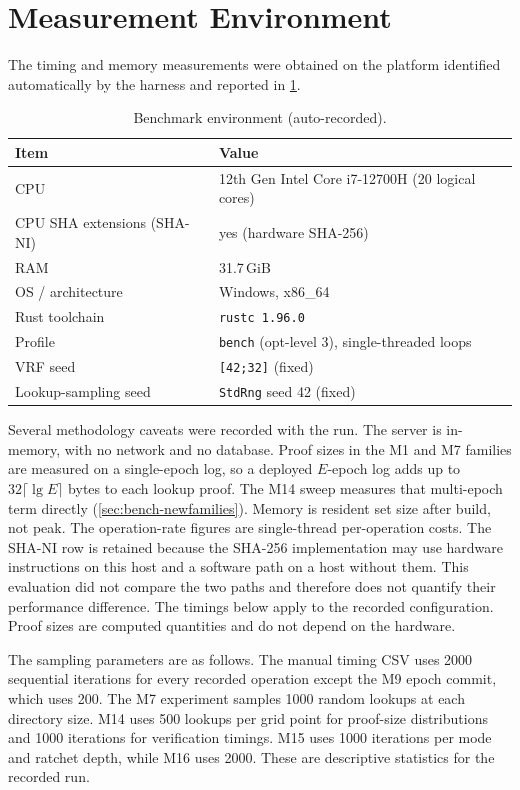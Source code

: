 \section{Measurement Environment}\label{sec:bench-env}

The timing and memory measurements were obtained on the platform identified automatically by the
harness and reported in \cref{tab:bench-env}.

\begin{table}[ht]
\centering
\caption{Benchmark environment (auto-recorded).}
\label{tab:bench-env}
\small
\begin{tabular}{@{}ll@{}}
\toprule
Item & Value \\
\midrule
CPU & 12th Gen Intel Core i7-12700H (20 logical cores) \\
CPU SHA extensions (SHA-NI) & yes (hardware SHA-256) \\
RAM & 31.7\,GiB \\
OS / architecture & Windows, x86\_64 \\
Rust toolchain & \texttt{rustc 1.96.0} \\
Profile & \texttt{bench} (opt-level 3), single-threaded loops \\
VRF seed & \texttt{[42;32]} (fixed) \\
Lookup-sampling seed & \texttt{StdRng} seed 42 (fixed) \\
\bottomrule
\end{tabular}
\end{table}

Several methodology caveats were recorded with the run. The server is in-memory, with no network and
no database. Proof sizes in the M1 and M7 families are measured on a single-epoch log, so a deployed
$E$-epoch log adds up to $32\lceil\lg E\rceil$ bytes to each lookup proof. The M14 sweep measures that
multi-epoch term directly (\cref{sec:bench-newfamilies}). Memory is resident set size after build, not peak.
The operation-rate figures are single-thread per-operation costs. The SHA-NI row is retained
because the SHA-256 implementation may use hardware instructions on this host and a software path
on a host without them. This evaluation did not compare the two paths and therefore does not
quantify their performance difference. The timings below apply to the recorded configuration.
Proof sizes are computed quantities and do not depend on the hardware.

The sampling parameters are as follows. The manual timing CSV uses \num{2000} sequential iterations
for every recorded operation except the M9 epoch commit, which uses \num{200}. The M7 experiment
samples \num{1000} random lookups at each directory size. M14 uses \num{500} lookups per grid point
for proof-size distributions and \num{1000} iterations for verification timings. M15 uses
\num{1000} iterations per mode and ratchet depth, while M16 uses \num{2000}. These are descriptive
statistics for the recorded run.

